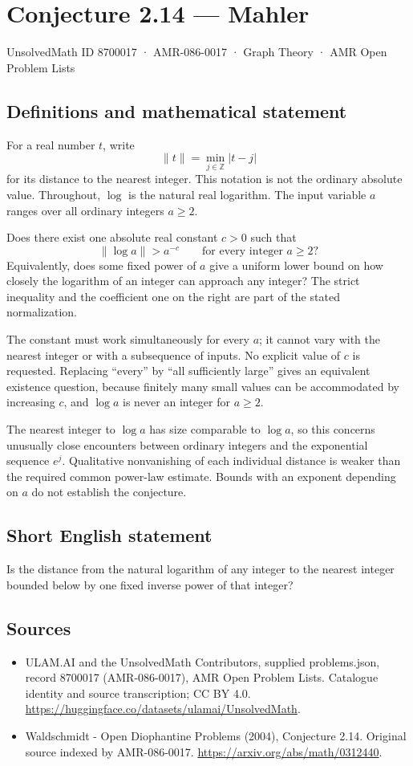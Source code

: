 \documentclass[11pt,a4paper]{article}
\begin{document}
\section*{Conjecture 2.14 — Mahler}\label{8700017}
{\small UnsolvedMath ID 8700017 · AMR-086-0017 · Graph Theory · AMR Open Problem Lists}
\subsection{Definitions and mathematical statement}
For a real number $t$, write
\[
\|t\|=\min_{j\in\mathbb Z}|t-j|
\]
for its distance to the nearest integer. This notation is not the ordinary absolute value. Throughout, $\log$ is the natural real logarithm. The input variable $a$ ranges over all ordinary integers $a\ge2$.

Does there exist one absolute real constant $c>0$ such that
\[
\|\log a\|>a^{-c}\qquad\text{for every integer }a\ge2?
\]
Equivalently, does some fixed power of $a$ give a uniform lower bound on how closely the logarithm of an integer can approach any integer? The strict inequality and the coefficient one on the right are part of the stated normalization.

The constant must work simultaneously for every $a$; it cannot vary with the nearest integer or with a subsequence of inputs. No explicit value of $c$ is requested. Replacing ``every'' by ``all sufficiently large'' gives an equivalent existence question, because finitely many small values can be accommodated by increasing $c$, and $\log a$ is never an integer for $a\ge2$.

The nearest integer to $\log a$ has size comparable to $\log a$, so this concerns unusually close encounters between ordinary integers and the exponential sequence $e^j$. Qualitative nonvanishing of each individual distance is weaker than the required common power-law estimate. Bounds with an exponent depending on $a$ do not establish the conjecture.
\subsection{Short English statement}
Is the distance from the natural logarithm of any integer to the nearest integer bounded below by one fixed inverse power of that integer?
\subsection{Sources}
\begin{itemize}
\item[S1] ULAM.AI and the UnsolvedMath Contributors, supplied problems.json, record 8700017 (AMR-086-0017), AMR Open Problem Lists. Catalogue identity and source transcription; CC BY 4.0.
\url{https://huggingface.co/datasets/ulamai/UnsolvedMath}.
\item[S2] Waldschmidt - Open Diophantine Problems (2004), Conjecture 2.14. Original source indexed by AMR-086-0017.
\url{https://arxiv.org/abs/math/0312440}.
\end{itemize}
\end{document}

